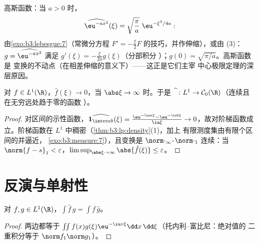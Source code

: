 \begin{example}\label{ex:b3:fouriertransform:gaussian}
高斯函数：当 $a > 0$ 时，
\[
\widehat{\eu^{-ax^2}}(\xi) =
\sqrt{\frac\pi a}\;\eu^{-\xi^2/4a} :
\]
由\cref{exo:b3:lebesgue:7}（常微分方程 $F' = -\frac\xi{2}F$
的技巧，并作伸缩），或由 (3)：$g = \widehat{\eu^{-ax^2}}$
满足 $g'(\xi) = -\frac{\xi}{2a}g(\xi)$（分部积分
）；$g(0) = \sqrt{\pi/a}$。高斯函数是
变换的不动点（在相差伸缩的意义下）——这正是它们主宰
中心极限定理的深层原因。
\end{example}

\begin{theorem}[黎曼–勒贝格引理]
\label{thm:b3:fouriertransform:riemannlebesgue}
对 $f \in L^1(\R)$，$\hat f(\xi) \to 0$，当 $\abs\xi \to
\infty$ 时。于是 $\widehat{\phantom f} \colon L^1 \to \mathcal
C_0(\R)$（连续且在无穷远处趋于零的函数
）。
\end{theorem}

\begin{proof}
对区间的示性函数，$\widehat{\mathbf 1_{\intcc
ab}}(\xi) = \frac{\eu^{-\iu a\xi} - \eu^{-\iu b\xi}}{\iu\xi}
\to 0$，故对阶梯函数成立。阶梯函数在
$L^1$ 中稠密（\cref{thm:b3:lp:density}(1)，加上
有限测度集由有限个区间的并逼近，
\cref{exo:b3:measure:7}），且变换是
$\norm\cdot_\infty$-$\norm\cdot_1$ 连续：当 $\norm{f -
s}_1 < \varepsilon$，$\limsup_{\abs\xi\to\infty}\abs{\hat
f(\xi)} \leq \varepsilon$。
\end{proof}

\section{反演与单射性}

\begin{lemma}[乘法公式]
\label{lem:b3:fouriertransform:multiplication}
对 $f, g \in L^1(\R)$，$\displaystyle\int \hat f\,g =
\int f\,\hat g$。
\end{lemma}

\begin{proof}
两边都等于 $\iint f(x)g(\xi)\eu^{-\iu x\xi}\dd
x\,\dd\xi$（托内利–富比尼：绝对值的
二重积分等于 $\norm f_1\norm g_1$）。
\end{proof}

